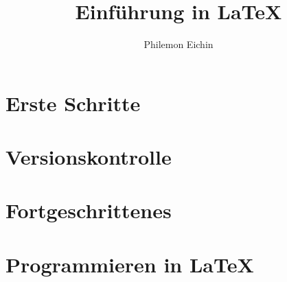 \documentclass[parskip]{scrbook}
\title{Einführung in \LaTeX}
\author{Philemon Eichin}
\begin{document}
    \maketitle
    \frontmatter
    
    \tableofcontents
    
    \mainmatter
    \part{Erste Schritte}
    \part{Versionskontrolle}
    \part{Fortgeschrittenes}
    \part{Programmieren in \LaTeX}
\end{document}
